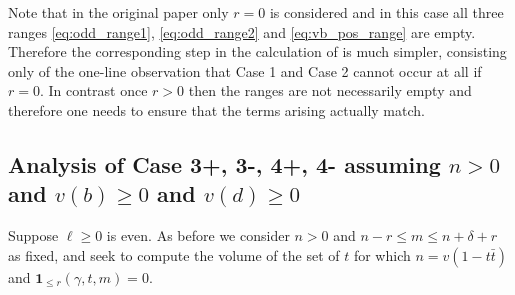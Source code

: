 \begin{remark}
  Note that in the original paper \cite{ref:AFL} only $r = 0$ is considered
  and in this case all three ranges \eqref{eq:odd_range1}, \eqref{eq:odd_range2}
  and \eqref{eq:vb_pos_range} are empty.
  Therefore the corresponding step in the calculation of \cite{ref:AFL}
  is much simpler, consisting only of the one-line observation that
  Case 1 and Case 2 cannot occur at all if $r = 0$.
  In contrast once $r > 0$ then the ranges are not necessarily empty
  and therefore one needs to ensure that the terms arising actually match.
\end{remark}

\subsection{Analysis of Case 3\ts+, 3\ts-, 4\ts+, 4\ts- assuming $n > 0$ and $v(b) \ge 0$ and $v(d) \ge 0$}
Suppose $\ell \geq 0$ is even.
As before we consider $n > 0$ and $n-r \le m \le n+\delta+r$ as fixed,
and seek to compute the volume of the set of $t$
for which $n = v(1-t\bar t)$ and $\mathbf{1}_{\le r}(\gamma,t,m) = 0$.

